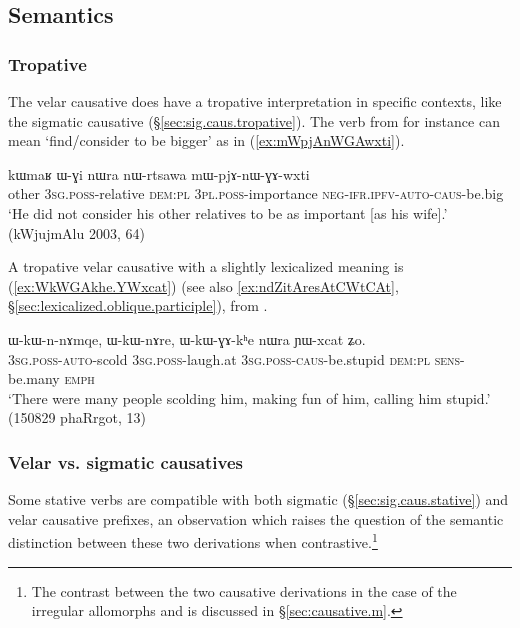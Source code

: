 \subsection{Semantics} \label{sec:velar.causative.semantics}
 
\subsubsection{Tropative} \label{sec:velar.causative.tropative}
 The velar causative does have a tropative interpretation in specific contexts, like the sigmatic causative (§\ref{sec:sig.caus.tropative}). The verb  from   for instance can mean `find/consider to be bigger' as in (\ref{ex:mWpjAnWGAwxti}).

 \begin{exe}
\ex \label{ex:mWpjAnWGAwxti}
\gll kɯmaʁ ɯ-ɣi nɯra nɯ-rtsawa mɯ-pjɤ-nɯ-ɣɤ-wxti \\
other \textsc{3sg}.\textsc{poss}-relative \textsc{dem}:\textsc{pl} \textsc{3pl}.\textsc{poss}-importance \textsc{neg}-\textsc{ifr}.\textsc{ipfv}-\textsc{auto}-\textsc{caus}-be.big \\
\glt `He did not consider his other relatives to be as important [as his wife].' (kWjujmAlu 2003, 64)
\end{exe} 

A tropative velar causative with a slightly lexicalized meaning is   (\ref{ex:WkWGAkhe.YWxcat}) (see also \ref{ex:ndZitAresAtCWtCAt}, §\ref{sec:lexicalized.oblique.participle}), from .
 
 \begin{exe}
\ex \label{ex:WkWGAkhe.YWxcat}
\gll  ɯ-kɯ-n-nɤmqe, ɯ-kɯ-nɤre, ɯ-kɯ-ɣɤ-kʰe nɯra ɲɯ-xcat ʑo. \\
\textsc{3sg}.\textsc{poss}-\textsc{auto}-scold \textsc{3sg}.\textsc{poss}-laugh.at \textsc{3sg}.\textsc{poss}-\textsc{caus}-be.stupid \textsc{dem}:\textsc{pl} \textsc{sens}-be.many \textsc{emph} \\
\glt `There were many people scolding him, making fun of him, calling him stupid.' (150829 phaRrgot, 13)
 \end{exe} 
 
\subsubsection{Velar vs. sigmatic causatives} \label{sec:velar.causative.vs.sigmatic.causative}
Some stative verbs are compatible with both sigmatic (§\ref{sec:sig.caus.stative}) and velar causative prefixes, an observation which raises the question of the semantic distinction between these two derivations when contrastive.\footnote{The contrast between the two causative derivations in the case of the irregular allomorphs  and  is discussed in §\ref{sec:causative.m}. }

